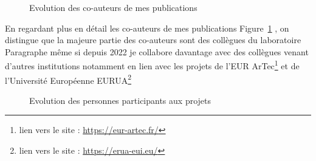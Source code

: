 \documentclass[
  a4paper,
  DIV=11,
  numbers=noendperiod]{scrreprt}
\begin{document}
\begin{figure}


\caption{\label{fig-wordstreamPublications}Evolution des co-auteurs de
mes publications}

\end{figure}%

En regardant plus en détail les co-auteurs de mes publications
Figure~\ref{fig-wordstreamPublications} , on distingue que la majeure
partie des co-auteurs sont des collègues du laboratoire Paragraphe même
si depuis 2022 je collabore davantage avec des collègues venant d'autres
institutions notamment en lien avec les projets de l'EUR
ArTec\footnote{lien vers le site : \url{https://eur-artec.fr/}} et de
l'Université Européenne EURUA\footnote{lien vers le site :
  \url{https://erua-eui.eu/}}

\begin{figure}


\caption{\label{fig-wordstreamProjet}Evolution des personnes
participants aux projets}

\end{figure}%
\end{document}
